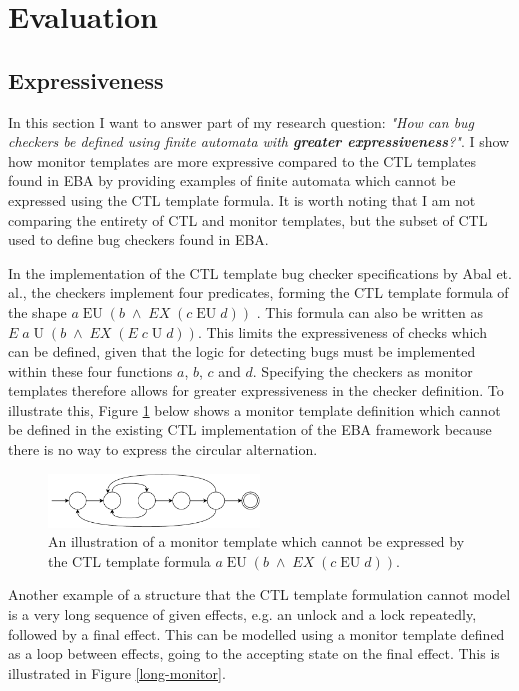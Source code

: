\section{Evaluation}

\subsection{Expressiveness}

In this section I want to answer part of my research question: \textit{"How can bug checkers be defined using finite automata with \textbf{greater expressiveness}?"}. I show how monitor templates are more expressive compared to the CTL templates found in EBA by providing examples of finite automata which cannot be expressed using the CTL template formula. It is worth noting that I am not comparing the entirety of CTL and monitor templates, but the subset of CTL used to define bug checkers found in EBA. 

\newpar In the implementation of the CTL template bug checker specifications by Abal et. al., the checkers implement four predicates, forming the CTL template formula of the shape $a\;\text{EU}\;(b\;\land\;EX\;(c\;\text{EU}\;d))$ \cite{Abal2017EffectiveBF}\cite{research-project}. This formula can also be written as $E\;a\;\text{U}\;(b\;\land\;EX\;(E\;c\;\text{U}\;d))$. This limits the expressiveness of checks which can be defined, given that the logic for detecting bugs must be implemented within these four functions $a$, $b$, $c$ and $d$. Specifying the checkers as monitor templates therefore allows for greater expressiveness in the checker definition. To illustrate this, Figure \ref{expressive-monitor} below shows a monitor template definition which cannot be defined in the existing CTL implementation of the EBA framework because there is no way to express the circular alternation.

\begin{figure}[H]
    \centering
    \includegraphics[width=0.5\textwidth]{evaluation/figures/monitor}
    \caption{An illustration of a monitor template which cannot be expressed by the CTL template formula $a\;\text{EU}\;(b\;\land\;EX\;(c\;\text{EU}\;d))$.}
    \label{expressive-monitor}
\end{figure}

\newpar Another example of a structure that the CTL template formulation cannot model is a very long sequence of given effects, e.g. an unlock and a lock repeatedly, followed by a final effect. This can be modelled using a monitor template defined as a loop between effects, going to the accepting state on the final effect. This is illustrated in Figure \ref{long-monitor}. 

